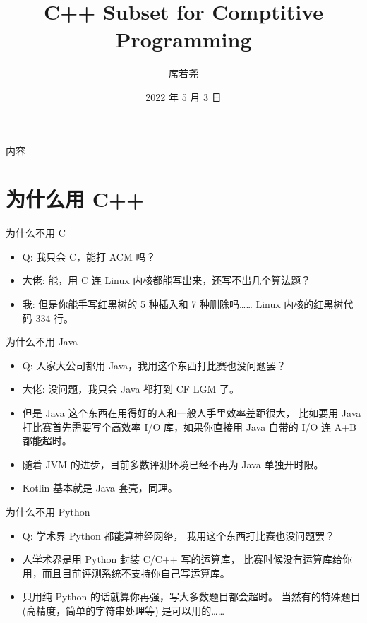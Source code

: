 \documentclass[10pt,mathserif]{beamer}
\title{C++ Subset for Comptitive Programming}
\institute{西安电子科技大学程序设计竞赛实训基地}
\author{席若尧}
\date{2022 年 5 月 3 日}
\begin{document}
%
{\xdbg {}}

\begin{frame}{内容}
	\tableofcontents[hideallsubsections]
\end{frame}

\section{为什么用 C++}
\sectionpage

\begin{frame}{为什么不用 C}
	\begin{itemize}
		\item Q: 我只会 C，能打 ACM 吗？
			\pause
		\item 大佬: 能，用 C 连 Linux 内核都能写出来，还写不出几个算法题？
			\pause
		\item 我: 但是你能手写红黑树的 5 种插入和 7 种删除吗……
			Linux 内核的红黑树代码 334 行。
	\end{itemize}
\end{frame}

\begin{frame}{为什么不用 Java}
	\begin{itemize}
		\item Q: 人家大公司都用 Java，我用这个东西打比赛也没问题罢？
			\pause
		\item 大佬: 没问题，我只会 Java 都打到 CF LGM 了。
			\pause
		\item 但是 Java 这个东西在用得好的人和一般人手里效率差距很大，
			比如要用 Java 打比赛首先需要写个高效率 I/O 库，如果你直接用
			Java 自带的 I/O 连 A+B 都能超时。
		\item 随着 JVM 的进步，目前多数评测环境已经不再为 Java 单独开时限。
			\pause
		\item Kotlin 基本就是 Java 套壳，同理。
	\end{itemize}
\end{frame}

\begin{frame}{为什么不用 Python}
	\begin{itemize}
		\item Q: 学术界 Python 都能算神经网络，
			我用这个东西打比赛也没问题罢？
		\item 人学术界是用 Python 封装 C/C++ 写的运算库，
			比赛时候没有运算库给你用，而且目前评测系统不支持你自己写运算库。
		\item 只用纯 Python 的话就算你再强，写大多数题目都会超时。
			当然有的特殊题目 (高精度，简单的字符串处理等) 是可以用的……
	\end{itemize}
\end{frame}
\end{document}
